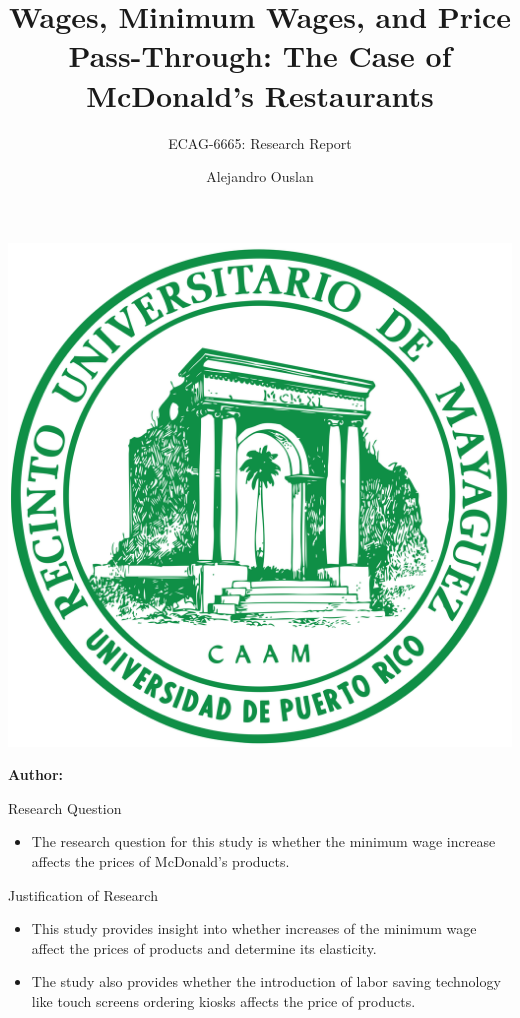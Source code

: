 \documentclass[12pt]{beamer}
\title[]{Wages, Minimum Wages, and Price Pass-Through:
	The Case of McDonald’s Restaurants}
\subtitle{ECAG-6665: Research Report}
\author[Name Surname]{Alejandro Ouslan}
\institute[institute]{University of Puerto Rico}
\date{} %
\begin{document}
\begin{frame}{}
	\vspace{\fill}

	\includegraphics[width=0.16\linewidth]{../../assets/uprm_logo.png}

	\vspace{\fill}

	\Large
	\color{main}
	\inserttitle

	\medskip

	\large
	\color{black}
	\insertsubtitle

	\vspace{\fill}

	\footnotesize
	\insertinstitute

	\vspace{\fill}

	\textbf{Author:} \insertauthor

	\medskip

	\insertdate

	\vspace{\fill}
\end{frame}

\begin{frame}[allowframebreaks]{Research Question}
	\begin{itemize}
		\item The research question for this study is whether the minimum wage increase affects the prices of McDonald's products.
	\end{itemize}

\end{frame}

\begin{frame}[allowframebreaks]{Justification of Research}
	\begin{itemize}
		\item This study provides insight into whether increases of the minimum wage affect the prices of products and determine its elasticity.
		\item The study also provides whether the introduction of labor saving technology like touch screens ordering kiosks affects the price of products.
	\end{itemize}

\end{frame}
\end{document}
